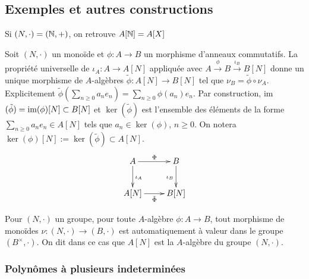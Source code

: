 \subsection{Exemples et autres constructions}

  \begin{remarque}Si $(N,\cdot)=(\mathbb{N},+)$, on retrouve $A[\mathbb{N}]=A[X]$\end{remarque}

  Soit $(N,\cdot)$ un monoïde et $\phi: A\rightarrow B$ un morphisme d'anneaux commutatifs. La propriété universelle de $\iota_A:A\rightarrow A[N]$ appliquée avec $A\stackrel{\phi}{\rightarrow} B\stackrel{\iota_B}{\rightarrow} B[N]$ donne un unique morphisme de $A$-algèbres $\tilde{\phi}:A[N]\rightarrow B[N]$ tel que $\nu_B=\tilde{\phi}\circ \nu_A$. Explicitement $\tilde{\phi}(\sum_{n\geq 0}a_ne_n)=\sum_{n\geq 0}\phi(a_n)e_n$.  Par construction, im$(\tilde{\phi})=\operatorname{im}(\phi)[N]\subset B[N]$ et $\ker(\tilde{\phi})$ est l'ensemble des éléments de la forme $\sum_{n\geq 0}a_ne_n\in A[N]$ tels que $a_n\in \ker(\phi)$, $n\geq 0$. On notera $\ker(\phi)[N]:=\ker(\tilde{\phi})\subset A[N]$.\\

	$$ \xymatrix{ A\ar[r]^\Phi \ar[d]^{\iota_A} & B \ar[d]_{\iota_B} \\ A[N]\ar[r]_{\tilde{\Phi} } & B[N] } $$
\begin{definition}Pour $(N,\cdot)$ un groupe, pour toute $A$-algèbre $\phi:A\rightarrow B$, tout morphisme de monoïdes $\nu:(N,\cdot)\rightarrow (B,\cdot)$ est automatiquement à valeur dans le groupe $(B^\times,\cdot)$. On dit dans ce cas que $ A[N]$ est la $A$-algèbre du groupe $(N,\cdot)$.\end{definition}

	\subsubsection{Polynômes à plusieurs indeterminées}

